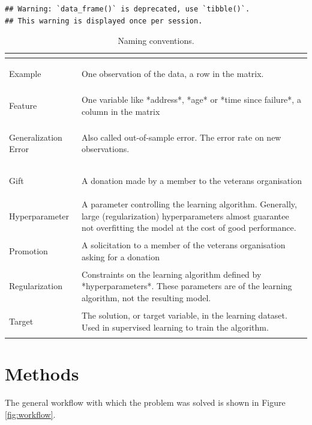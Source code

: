 \documentclass[
  11pt,
  a4paper,
  DIV=12,captions=tableheading,oneside]{scrbook}
\begin{document}
\begin{lstlisting}[basicstyle={\bfseries}]
## Warning: `data_frame()` is deprecated, use `tibble()`.
## This warning is displayed once per session.
\end{lstlisting}
\begin{table}[!h]

\caption{\label{tab:glossary-table}Naming conventions.}
\centering
\begin{tabular}{>{\bfseries\raggedright\arraybackslash}p{3cm}>{\raggedright\arraybackslash}p{10cm}}
\toprule
 & \\
\midrule
Example & One observation of the data, a row in the matrix.\\
Feature & One variable like *address*, *age* or *time since failure*, a column in the matrix\\
Generalization Error & Also called out-of-sample error. The error rate on new observations.\\
Gift & A donation made by a member to the veterans organisation\\
Hyperparameter & A parameter controlling the learning algorithm. Generally, large (regularization) hyperparameters almost guarantee not overfitting the model at the cost of good performance.\\
\addlinespace
Promotion & A solicitation to a member of the veterans organisation asking for a donation\\
Regularization & Constraints on the learning algorithm defined by *hyperparameters*. These parameters are of the learning algorithm, not the resulting model.\\
Target & The solution, or target variable, in the learning dataset. Used in supervised learning to train the algorithm.\\
\bottomrule
\end{tabular}
\end{table}

\hypertarget{methods}{%
\chapter{Methods}\label{methods}}

The general workflow with which the problem was solved is shown in Figure \ref{fig:workflow}.
\end{document}
